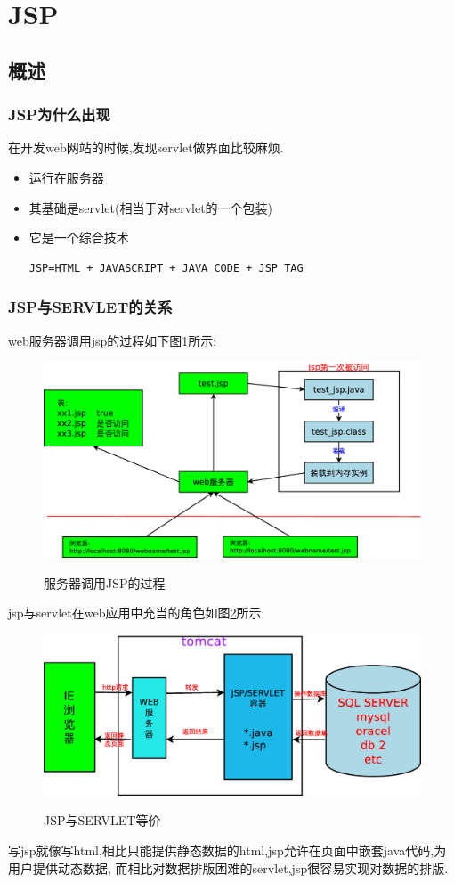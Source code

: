 \section{JSP}
\subsection{概述}
\subsubsection{JSP为什么出现}
在开发web网站的时候,发现servlet做界面比较麻烦.
\begin{itemize}
\item 运行在服务器
\item 其基础是servlet(相当于对servlet的一个包装)
\item 它是一个综合技术
\begin{lstlisting}[style=JAVA]
JSP=HTML + JAVASCRIPT + JAVA CODE + JSP TAG
\end{lstlisting}
\end{itemize}


\subsubsection{JSP与SERVLET的关系}
web服务器调用jsp的过程如下图\ref{figs:fig1}所示: 
\begin{figure}[!htbp]
	\centering
	\caption{服务器调用JSP的过程}
    	\includegraphics[scale=0.22]{figs/JSP}
    \label{figs:fig1}
\end{figure}
jsp与servlet在web应用中充当的角色如图\ref{figs:fig2}所示:
\begin{figure}[!htbp]
	\centering
	\caption{JSP与SERVLET等价}
    	\includegraphics[scale=0.25]{figs/JSP_SERVLET}
    \label{figs:fig2}
\end{figure}
写jsp就像写html,相比只能提供静态数据的html,jsp允许在页面中嵌套java代码,为用户提供动态数据,
而相比对数据排版困难的servlet,jsp很容易实现对数据的排版.
